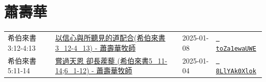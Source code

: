 \documentclass{book}
\begin{document}
\chapter{蕭壽華}\label{ch:preacher4}
\begin{multicols}{3}
\minitoc
\end{multicols}
{ \scriptsize


\begin{xltabular}{\textwidth}{|p{0.15\textwidth} p{0.6\textwidth}|p{0.07\textwidth} p{0.1\textwidth}|}
\hline
希伯來書 3:12-4:13 & \hyperref[sec:toZa1ewaUWE]{以信心與所聽見的道配合(希伯來書3\_12-4\_13) - 蕭壽華牧師} & 2025-01-08 & \href{https://youtube.com/watch?v=toZa1ewaUWE}{\texttt{ toZa1ewaUWE}} \\
希伯來書 5:11-14 & \hyperref[sec:8LlYAk0Xlok]{嘗過天恩 卻長蒺藜 (希伯來書5\_11-14;6\_1-12) - 蕭壽華牧師} & 2025-01-04 & \href{https://youtube.com/watch?v=8LlYAk0Xlok}{\texttt{ 8LlYAk0Xlok}} \\
\hline
\end{xltabular}
}
\newpage
\end{document}
